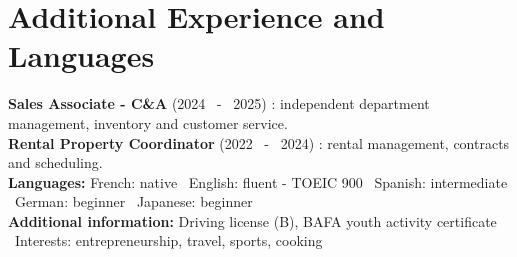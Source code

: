 \documentclass[10pt,a4paper]{article}
\newcommand{\sm}[1]{{\fontsize{8.5}{10.2}\selectfont #1}}
\begin{document}
\section{Additional Experience and Languages}
\sm{\textbf{Sales Associate - C\&A} \textcolor{muted}{(2024 \ - \ 2025)} : independent department management, inventory and customer service.\\[2pt]
\textbf{Rental Property Coordinator} \textcolor{muted}{(2022 \ - \ 2024)} : rental management, contracts and scheduling.\\[3pt]
\textbf{Languages:} French: native \textbar\ English: fluent - TOEIC 900 \textbar\ Spanish: intermediate \textbar\ German: beginner \textbar\ Japanese: beginner\\[3pt]
\textbf{Additional information:} Driving license (B), BAFA youth activity certificate \textbar\ Interests: entrepreneurship, travel, sports, cooking}
\end{document}

